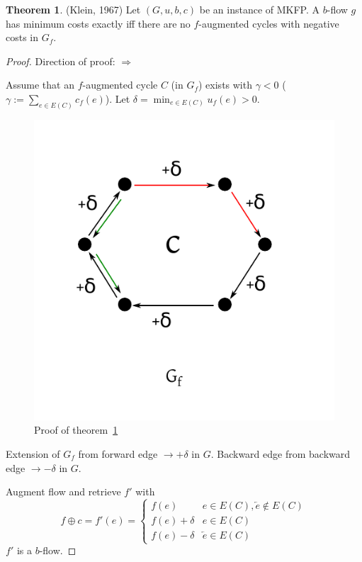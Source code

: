 \documentclass[a4paper]{article}
\theoremstyle{definition}
\newtheorem{theorem}{Theorem}
\begin{document}
\begin{theorem}\label{satz-5.3}
  (Klein, 1967)
  Let $(G, u, b, c)$ be an instance of MKFP. A $b$-flow $g$ has minimum costs exactly iff there are no $f$-augmented cycles with negative costs in $G_f$.
\end{theorem}

\begin{proof}
  Direction of proof: $\Rightarrow$

  Assume that an $f$-augmented cycle $C$ (in $G_f$) exists with $\gamma < 0$ ($\gamma := \sum_{e \in E(C)} c_f(e)$). Let $\delta = \min_{e \in E(C)} u_f(e) > 0$.

  \begin{figure}[ht]
   \begin{center}
    \includegraphics{img/satz_5_3.pdf}
    \caption{Proof of theorem~\ref{satz-5.3}}
   \end{center}
  \end{figure}

  Extension of $G_f$ from forward edge $\rightarrow +\delta$ in $G$. Backward edge from backward edge $\rightarrow -\delta$ in $G$.

  Augment flow and retrieve $f'$ with
  \[
    f \oplus c = f'(e) = \begin{cases}
      f(e)      & e \in E(C), \overleftarrow{e} \notin E(C) \\
      f(e) + \delta    & e \in E(C) \\
      f(e) - \delta    & \overleftarrow{e} \in E(C)
    \end{cases}
  \]
  $f'$ is a $b$-flow.


\end{proof}
\end{document}
